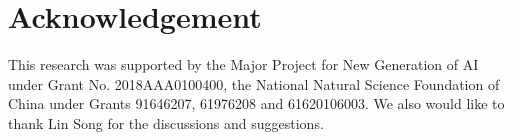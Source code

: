 \documentclass[runningheads]{llncs}
\begin{document}
\section{Acknowledgement}
This research was supported by the Major Project for New Generation of AI under Grant No. 2018AAA0100400, the National Natural Science Foundation of China under Grants 91646207, 61976208 and 61620106003. We also would like to thank Lin Song for the discussions and suggestions.

\clearpage


\end{document}
